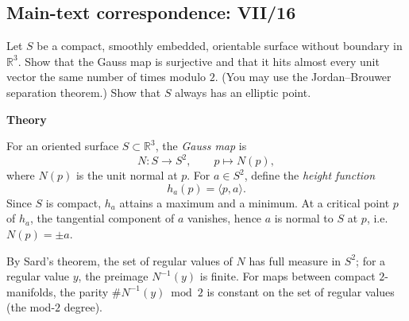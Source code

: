 \subsection*{Main-text correspondence: VII/16}

\begin{problem}
\label{prob:cp-vii-0047}
Let $S$ be a compact, smoothly embedded, orientable surface without boundary in $\mathbb R^3$. Show that the Gauss map is surjective
	and that it hits almost every unit vector the same number of times modulo $2$.
	(You may use the Jordan--Brouwer separation theorem.) Show that $S$ always has an elliptic point.
	
	\par\medskip\noindent\textbf{Theory}\par\smallskip

	For an oriented surface $S\subset\mathbb R^3$, the \emph{Gauss map} is
	\[
	N:S\to S^2,\qquad p\mapsto N(p),
	\]
	where $N(p)$ is the unit normal at $p$.
	For $a\in S^2$, define the \emph{height function}
	\[
	h_a(p)=\langle p,a\rangle.
	\]
	Since $S$ is compact, $h_a$ attains a maximum and a minimum.
	At a critical point $p$ of $h_a$, the tangential component of $a$ vanishes, hence $a$ is normal
	to $S$ at $p$, i.e.\ $N(p)=\pm a$.
	
	By Sard's theorem, the set of regular values of $N$ has full measure in $S^2$; for a regular value
	$y$, the preimage $N^{-1}(y)$ is finite.
	For maps between compact $2$-manifolds, the parity $\#N^{-1}(y)\bmod 2$ is constant on the set
	of regular values (the mod-$2$ degree).
\end{problem}

